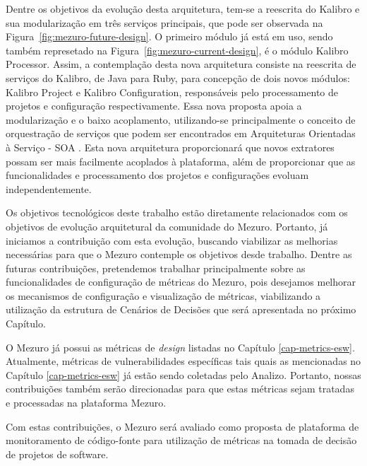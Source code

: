 Dentre os objetivos da evolução desta arquitetura, tem-se a reescrita do Kalibro e sua modularização em três serviços principais, que pode ser observada na Figura~\ref{fig:mezuro-future-design}.
%
O primeiro módulo já está em uso, sendo também represetado na Figura~\ref{fig:mezuro-current-design}, é o módulo Kalibro Processor.
%
Assim, a contemplação desta nova arquitetura consiste na reescrita de serviços do Kalibro, de Java para Ruby, para concepção de dois novos módulos: Kalibro Project e Kalibro Configuration, responsáveis pelo processamento de projetos e configuração respectivamente.
%
Essa nova proposta apoia a modularização e o baixo acoplamento, utilizando-se principalmente o conceito de orquestração de serviços que podem ser encontrados em Arquiteturas Orientadas à Serviço - SOA \cite{thomaserl2007}. Esta nova arquitetura proporcionará que novos extratores possam ser mais facilmente acoplados à plataforma, além de proporcionar que as funcionalidades e processamento dos projetos e configurações evoluam independentemente.

%


Os objetivos tecnológicos deste trabalho estão diretamente relacionados com os objetivos de evolução arquitetural da comunidade do Mezuro. Portanto, já iniciamos a contribuição com esta evolução, buscando viabilizar as melhorias necessárias para que o Mezuro contemple os objetivos desde trabalho. Dentre as futuras contribuições, pretendemos trabalhar principalmente sobre as funcionalidades de configuração de métricas do Mezuro, pois desejamos melhorar os mecanismos de configuração e visualização de métricas, viabilizando a utilização da estrutura de Cenários de Decisões que será apresentada no próximo Capítulo.

%

O Mezuro já possui as métricas de \emph{design} listadas no Capítulo \ref{cap-metrics-esw}. Atualmente, métricas de vulnerabilidades específicas tais quais as mencionadas no Capítulo \ref{cap-metrics-esw} já estão sendo coletadas pelo Analizo. Portanto, nossas contribuições também serão direcionadas para que estas métricas sejam tratadas e processadas na plataforma Mezuro. 

%

Com estas contribuições, o Mezuro será avaliado como proposta de plataforma de monitoramento de código-fonte para utilização de métricas na tomada de decisão de projetos de software.

%



